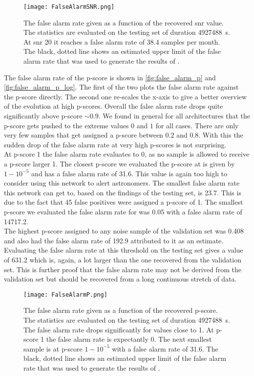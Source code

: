 \begin{figure}
\centering
\texttt{[image: FalseAlarmSNR.png]}
\caption[False alarm rate for SNR]{The false alarm rate given as a function of the recovered \gls{snr} value. The statistics are evaluated on the testing set of duration \SI{4927488}{\s}. At \gls{snr} 20 it reaches a false alarm rate of 38.4 samples per month. The black, dotted line shows an estimated upper limit of the false alarm rate that was used to generate the results of \cite{bns_network}.}\label{fig:false_alarm_snr}
\end{figure}
\noindent The false alarm rate of the p-score is shown in \autoref{fig:false_alarm_p} and \autoref{fig:false_alarm_p_log}. The first of the two plots the false alarm rate against the p-score directly. The second one re-scales the x-axis to give a better overview of the evolution at high p-scores. Overall the false alarm rate drops quite significantly above p-score $\sim 0.9$. We found in general for all architectures that the p-score gets pushed to the extreme values $0$ and $1$ for all cases. There are only very few samples that get assigned a p-score between $0.2$ and $0.8$. With this the sudden drop of the false alarm rate at very high p-scores is not surprising.\\
At p-score 1 the false alarm rate evaluates to 0, as no sample is allowed to receive a p-score larger 1. The closest p-score we evaluated the p-score at is given by $1-10^{-5}$ and has a false alarm rate of 31.6. This value is again too high to consider using this network to alert astronomers. The smallest false alarm rate this network can get to, based on the findings of the testing set, is 23.7. This is due to the fact that 45 false positives were assigned a p-score of 1. The smallest p-score we evaluated the false alarm rate for was 0.05 with a false alarm rate of 14717.2.\\
The highest p-score assigned to any noise sample of the validation set was 0.408 and also had the false alarm rate of 192.9 attributed to it as an estimate. Evaluating the false alarm rate at this threshold on the testing set gives a value of 631.2 which is, again, a lot larger than the one recovered from the validation set. This is further proof that the false alarm rate may not be derived from the validation set but should be recovered from a long continuous stretch of data.\medskip\\
\begin{figure}
\centering
\texttt{[image: FalseAlarmP.png]}
\caption[False alarm rate for p-score]{The false alarm rate given as a function of the recovered p-score. The statistics are evaluated on the testing set of duration \SI{4927488}{\s}. The false alarm rate drops significantly for values close to 1. At p-score 1 the false alarm rate is expectantly 0. The next smallest sample is at p-score $1-10^{-5}$ with a false alarm rate of 31.6. The black, dotted line shows an estimated upper limit of the false alarm rate that was used to generate the results of \cite{bns_network}.}\label{fig:false_alarm_p}
\end{figure}
